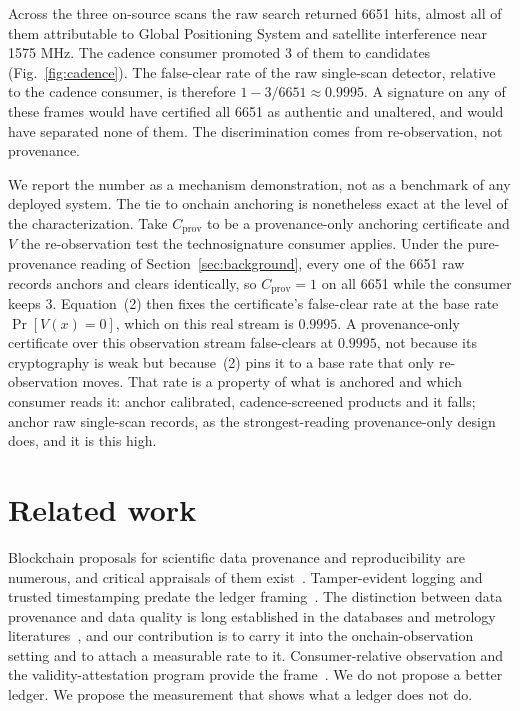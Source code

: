 \documentclass[conference]{IEEEtran}
\begin{document}
Across the three on-source scans the raw search returned 6651 hits, almost all of
them attributable to Global Positioning System and satellite interference near
1575 MHz. The cadence consumer promoted 3 of them to candidates
(Fig.~\ref{fig:cadence}). The false-clear rate of the raw single-scan detector,
relative to the cadence consumer, is therefore $1 - 3/6651 \approx 0.9995$. A
signature on any of these frames would have certified all 6651 as authentic and
unaltered, and would have separated none of them. The discrimination comes from
re-observation, not provenance.

We report the number as a mechanism demonstration, not as a benchmark of any
deployed system. The tie to onchain anchoring is nonetheless exact at the level
of the characterization. Take $C_{\mathrm{prov}}$ to be a provenance-only
anchoring certificate and $V$ the re-observation test the technosignature
consumer applies. Under the pure-provenance reading of Section~\ref{sec:background},
every one of the 6651 raw records anchors and clears identically, so
$C_{\mathrm{prov}}=1$ on all 6651 while the consumer keeps 3. Equation~(2) then
fixes the certificate's false-clear rate at the base rate $\Pr[V(x)=0]$, which on
this real stream is $0.9995$. A provenance-only certificate over this observation
stream false-clears at $0.9995$, not because its cryptography is weak but
because~(2) pins it to a base rate that only re-observation moves. That rate is a property of what is anchored
and which consumer reads it: anchor calibrated, cadence-screened products and it
falls; anchor raw single-scan records, as the strongest-reading provenance-only
design does, and it is this high.

\section{Related work}\label{sec:related}
Blockchain proposals for scientific data provenance and reproducibility are
numerous, and critical appraisals of them
exist~\cite{blockchain-science,blockchain-critique}. Tamper-evident logging and
trusted timestamping predate the ledger framing~\cite{rfc3161,merkle}. The
distinction between data provenance and data quality is long established in the
databases and metrology literatures~\cite{provenance-survey,dataquality}, and our
contribution is to carry it into the onchain-observation setting and to attach a
measurable rate to it. Consumer-relative observation and the validity-attestation
program provide the frame~\cite{ot,p3787}. We do not propose a better ledger. We
propose the measurement that shows what a ledger does not do.
\end{document}

